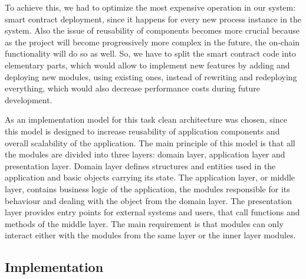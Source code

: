 To achieve this, we had to optimize the most expensive operation in our system: smart contract deployment, since it happens for every new process instance in the system. Also the issue of reusability of components becomes more crucial because as the project will become progressively more complex in the future, the on-chain functionality will do so as well. So, we have to split the smart contract code into elementary parts, which would allow to implement new features by adding and deploying new modules, using existing ones, instead of rewriting and redeploying everything, which would also decrease performance costs during future development.

As an implementation model for this task clean architecture was chosen, since this model is designed to increase reusability of application components and overall scalability of the application. The main principle of this model is that all the modules are divided into three layers: domain layer, application layer and presentation layer. Domain layer defines structures and entities used in the application and basic objects carrying its state. The application layer, or middle layer, contains business logic of the application, the modules responsible for its behaviour and dealing with the object from the domain layer. The presentation layer provides entry points for external systems and users, that call functions and methods of the middle layer. The main requirement is that modules can only interact either with the modules from the same layer or the inner layer modules.

\subsection{Implementation}
\label{sec:impr:eth:implementation}

